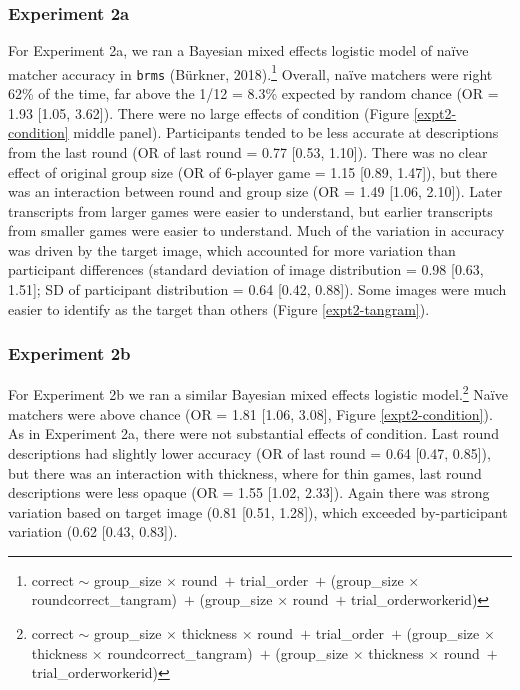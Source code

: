 \documentclass[10pt, letterpaper]{article}
\begin{document}
\subsubsection{Experiment 2a}\label{experiment-2a-1}

For Experiment 2a, we ran a Bayesian mixed effects logistic model of
naïve matcher accuracy in \texttt{brms} (Bürkner, 2018).\footnote{correct
  \({\sim}\) group\_size \({\times}\) round~\({+}\) trial\_order~\({+}\)
  (group\_size \({\times}\) round\textbar correct\_tangram)~\({+}\)
  (group\_size \({\times}\) round~\({+}\) trial\_order\textbar workerid)}
Overall, naïve matchers were right 62\% of the time, far above the 1/12
= 8.3\% expected by random chance (OR = 1.93 {[}1.05, 3.62{]}). There
were no large effects of condition (Figure \ref{expt2-condition} middle
panel). Participants tended to be less accurate at descriptions from the
last round (OR of last round = 0.77 {[}0.53, 1.10{]}). There was no
clear effect of original group size (OR of 6-player game = 1.15 {[}0.89,
1.47{]}), but there was an interaction between round and group size (OR
= 1.49 {[}1.06, 2.10{]}). Later transcripts from larger games were
easier to understand, but earlier transcripts from smaller games were
easier to understand. Much of the variation in accuracy was driven by
the target image, which accounted for more variation than participant
differences (standard deviation of image distribution = 0.98 {[}0.63,
1.51{]}; SD of participant distribution = 0.64 {[}0.42, 0.88{]}). Some
images were much easier to identify as the target than others (Figure
\ref{expt2-tangram}).

\subsubsection{Experiment 2b}\label{experiment-2b-1}

For Experiment 2b we ran a similar Bayesian mixed effects logistic
model.\footnote{correct \({\sim}\) group\_size \({\times}\) thickness
  \({\times}\) round~\({+}\) trial\_order~\({+}\) (group\_size
  \({\times}\) thickness \({\times}\)
  round\textbar correct\_tangram)~\({+}\) (group\_size \({\times}\)
  thickness \({\times}\) round~\({+}\) trial\_order\textbar workerid)}
Naïve matchers were above chance (OR = 1.81 {[}1.06, 3.08{]}, Figure
\ref{expt2-condition}). As in Experiment 2a, there were not substantial
effects of condition. Last round descriptions had slightly lower
accuracy (OR of last round = 0.64 {[}0.47, 0.85{]}), but there was an
interaction with thickness, where for thin games, last round
descriptions were less opaque (OR = 1.55 {[}1.02, 2.33{]}). Again there
was strong variation based on target image (0.81 {[}0.51, 1.28{]}),
which exceeded by-participant variation (0.62 {[}0.43, 0.83{]}).
\end{document}
